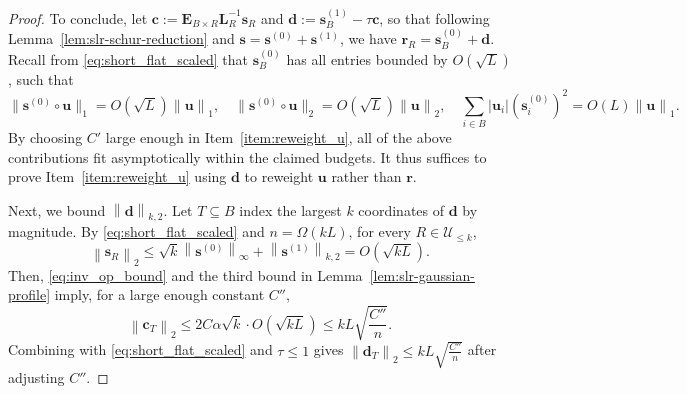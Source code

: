 \documentclass[11pt]{article}
\newcommand{\defeq}{:=}
\newcommand{\norm}[1]{\left\lVert#1\right\rVert}
\newcommand{\norms}[1]{\lVert#1\rVert}
\newcommand{\1}{\mathbf{1}}
\newcommand{\0}{\mathbf{0}}
\newcommand{\Par}[1]{\left(#1\right)}
\newcommand{\me}{{\mathbf{E}}}
\newcommand{\ml}{{\mathbf{L}}}
\newcommand{\vc}{{\mathbf{c}}}
\newcommand{\vd}{{\mathbf{d}}}
\newcommand{\vr}{{\mathbf{r}}}
\newcommand{\vs}{{\mathbf{s}}}
\newcommand{\vu}{{\mathbf{u}}}
\newcommand{\calU}{{\mathcal{U}}}
\begin{document}
\begin{proof}
To conclude, let $\vc \defeq \me_{B \times R}\ml_R^{-1} \vs_R$ and $\vd \defeq \vs^{(1)}_B - \tau\vc$, so that following Lemma~\ref{lem:slr-schur-reduction} and $\vs = \vs^{(0)} + \vs^{(1)}$, we have $\vr_R = \vs^{(0)}_B + \vd$. Recall from \eqref{eq:short_flat_scaled} that $\vs^{(0)}_B$ has all entries bounded by $O(\sqrt{L})$, such that 
\[\norms{\vs^{(0)} \circ \vu}_1 = O(\sqrt{L})\norm{\vu}_1, \quad \norms{\vs^{(0)} \circ \vu}_2 = O(\sqrt{L})\norm{\vu}_2, \quad \sum_{i \in B} |\vu_i| (\vs_i^{(0)})^2 = O\Par{L}\norm{\vu}_1.\]
By choosing $C'$ large enough in Item~\ref{item:reweight_u}, all of the above contributions fit asymptotically within the claimed budgets. It thus suffices to prove Item~\ref{item:reweight_u} using $\vd$ to reweight $\vu$ rather than $\vr$.

Next, we bound $\norm{\vd}_{k, 2}$. Let $T \subseteq B$ index the largest $k$ coordinates of $\vd$ by magnitude.
By \eqref{eq:short_flat_scaled} and $n = \Omega(kL)$, for every $R \in \calU_{\le k}$, 
\[\norm{\vs_R}_2 \le \sqrt{k}\norm{\vs^{(0)}}_\infty + \norm{\vs^{(1)}}_{k, 2} = O(\sqrt{kL}).\]
Then, \eqref{eq:inv_op_bound} and the third bound in Lemma~\ref{lem:slr-gaussian-profile} imply, for a large enough constant $C''$,
\[\norm{\vc_T}_2 \le 2C\alpha\sqrt{k} \cdot O(\sqrt{kL}) \le kL\sqrt{\frac{C''}{n}}.\]Combining with \eqref{eq:short_flat_scaled} and $\tau \le 1$ gives $\norm{\vd_T}_2 \le kL\sqrt{\frac{C''}{n}}$ after adjusting $C''$. 


\end{proof}
\end{document}
